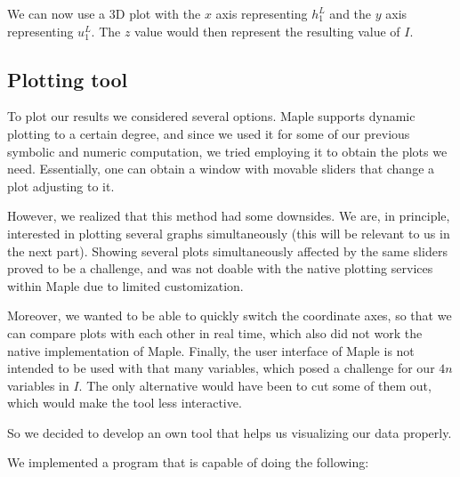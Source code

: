 \documentclass{article}
\newcommand{\todo}[2][]{\textcolor{red}{TODO\ifthenelse{\equal{#1}{}}{}{[#1]}: #2}}
\begin{document}
We can now use a 3D plot with the $x$ axis representing $h_1^L$ and the $y$ axis representing $u_1^L$. The $z$ value would then represent the resulting value of $I$.

\subsection{Plotting tool}
\label{sec:plotting-tool-intro}

To plot our results we considered several options. Maple supports dynamic plotting to a certain degree, and since we used it for some of our previous symbolic and numeric computation, we tried employing it to obtain the plots we need. Essentially, one can obtain a window with movable sliders that change a plot adjusting to it.

However, we realized that this method had some downsides. We are, in principle, interested in plotting several graphs simultaneously (this will be relevant to us in the next part). Showing several plots simultaneously affected by the same sliders proved to be a challenge, and was not doable with the native plotting services within Maple due to limited customization.


Moreover, we wanted to be able to quickly switch the coordinate axes, so that we can compare plots with each other in real time, which also did not work the native implementation of Maple. Finally, the user interface of Maple is not intended to be used with that many variables, which posed a challenge for our $4n$ variables in $I$. The only alternative would have been to cut some of them out, which would make the tool less interactive.

So we decided to develop an own tool that helps us visualizing our data properly.

We implemented a program that is capable of doing the following:
\end{document}
